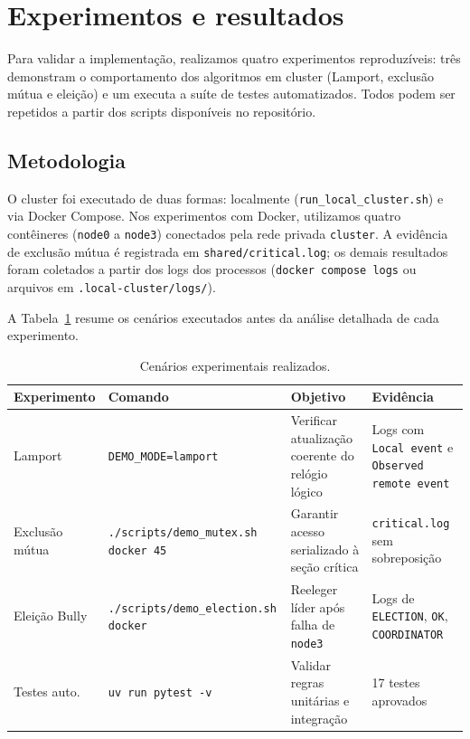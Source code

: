 \documentclass[10pt, a4paper, titlepage]{extarticle}
\begin{document}
\section{Experimentos e resultados}
\label{sec:experimentos}
Para validar a implementação, realizamos quatro experimentos reproduzíveis: três demonstram o comportamento dos algoritmos em cluster (Lamport, exclusão mútua e eleição) e um executa a suíte de testes automatizados. Todos podem ser repetidos a partir dos scripts disponíveis no repositório.

\subsection{Metodologia}
O cluster foi executado de duas formas: localmente (\texttt{run\_local\_cluster.sh}) e via Docker Compose. Nos experimentos com Docker, utilizamos quatro contêineres (\texttt{node0} a \texttt{node3}) conectados pela rede privada \texttt{cluster}. A evidência de exclusão mútua é registrada em \texttt{shared/critical.log}; os demais resultados foram coletados a partir dos logs dos processos (\texttt{docker compose logs} ou arquivos em \texttt{.local-cluster/logs/}).

A Tabela~\ref{tab:experimentos} resume os cenários executados antes da análise detalhada de cada experimento.

\begin{table}[ht]
  \centering
  \caption{Cenários experimentais realizados.}
  \label{tab:experimentos}
  \small
  \begin{tabular}{@{}p{2.2cm}p{3.8cm}p{4.2cm}p{3.8cm}@{}}
    \toprule
    Experimento & Comando & Objetivo & Evidência \\
    \midrule
    Lamport & \texttt{DEMO\_MODE=lamport} &
    Verificar atualização coerente do relógio lógico & Logs com \texttt{Local event} e \texttt{Observed remote event} \\[0.4em]
    Exclusão mútua & \texttt{./scripts/demo\_mutex.sh docker 45} &
    Garantir acesso serializado à seção crítica &
    \texttt{critical.log} sem sobreposição \\[0.4em]
    Eleição Bully &
    \texttt{./scripts/demo\_election.sh docker} &
    Reeleger líder após falha de \texttt{node3} &
    Logs de \texttt{ELECTION}, \texttt{OK}, \texttt{COORDINATOR} \\[0.4em]
    Testes auto. &
    \texttt{uv run pytest -v} &
    Validar regras unitárias e integração &
    17 testes aprovados \\
    \bottomrule
  \end{tabular}
\end{table}
\end{document}
